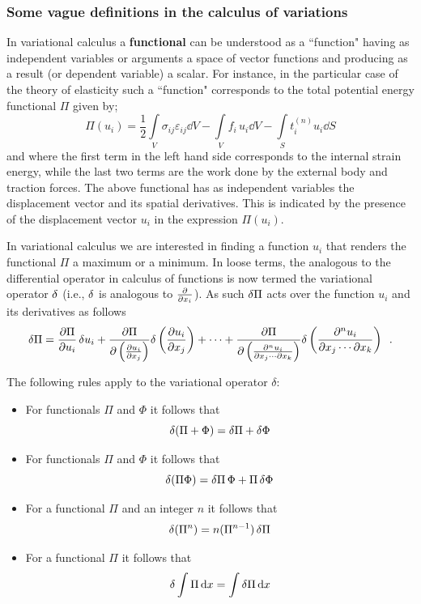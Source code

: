 \subsubsection*{Some vague definitions in the calculus of variations}
In variational calculus a {\bf functional} can be understood as a ``function" having as independent variables or arguments a space of vector functions and producing as a result (or dependent variable) a scalar. For instance, in the particular case of the theory of elasticity such a ``function" corresponds to the total potential energy functional $\Pi$ given by;
\begin{equation}\label{eq:Potential}
    \Pi(u_i) = \frac{1}{2}\int\limits_V \sigma_{ij}\varepsilon_{ij}\dd{V}  - \int\limits_V f_i\, u_i\dd{V}  - \int\limits_S t_i^{(n)} u_i\dd{S}
\end{equation}
and where the first term in the left hand side corresponds to the internal strain energy, while the last two terms are the work done by the external body and traction forces. The above functional has as independent variables the displacement vector and its spatial derivatives. This is indicated by the presence of the displacement vector $u_i$ in the expression $\Pi(u_i)$.

In variational calculus we are interested in finding a function $u_i$ that renders the functional $\Pi$ a maximum or a minimum. In loose terms, the analogous to the differential operator in calculus of functions is now termed the variational operator $\var$ (i.e., $\var$ is analogous to $\pdv{x_i}$). As such $\var{\Pi}$ acts over the function $u_i$ and its derivatives as follows
\[\var{\Pi}  = \pdv{\Pi}{u_i}\var{u_i} + \pdv{\Pi}{\left( \pdv{u_i}{x_j}\right)} \delta\left(\pdv{u_i}{x_j}\right) + \cdots + \pdv{\Pi}{\left( \pdv{^{n}u_i}{x_j \cdots \partial x_k}\right)} \delta\left( \pdv{^{n}u_i}{x_j \cdots \partial x_k}\right) \enspace .\]

The following rules apply to the variational operator $\delta$:
\begin{itemize}
\item For functionals $\Pi$ and $\Phi$ it follows that \[\var(\Pi  + \Phi) = \var{\Pi}  + \var{\Phi}\]
\item For functionals $\Pi$ and $\Phi$ it follows that \[\var(\Pi \Phi ) = \var{\Pi} \Phi  + \Pi \var{\Phi}\]
\item For a functional $\Pi$ and an integer $n$ it follows that \[\var(\Pi^n) = n(\Pi^{n - 1})\var{\Pi}\]
\item For a functional $\Pi$ it follows that \[\var{\int \Pi \dd{x}}  = \int \var{\Pi} \dd{x} \]
\end{itemize}

